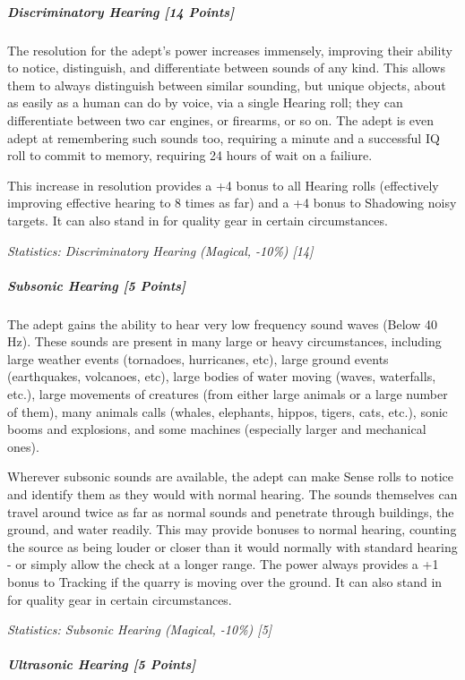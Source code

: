 \begin{multicols*}{3}
	\subparagraph{Discriminatory Hearing [14 Points]}
	
		The resolution for the adept's power increases immensely, improving their ability to notice, distinguish, and differentiate between sounds of any kind. This allows them to always distinguish between similar sounding, but unique objects, about as easily as a human can do by voice, via a single Hearing roll; they can differentiate between two car engines, or firearms, or so on. The adept is even adept at remembering such sounds too, requiring a minute and a successful IQ roll to commit to memory, requiring 24 hours of wait on a failiure.
		
		This increase in resolution provides a +4 bonus to all Hearing rolls (effectively improving effective hearing to 8 times as far) and a +4 bonus to Shadowing noisy targets. It can also stand in for quality gear in certain circumstances.
	
		\textcolor{OliveGreen}{\textit{Statistics: Discriminatory Hearing (Magical, -10\%) [14] }}
	
	\subparagraph{Subsonic Hearing [5 Points]}
	
		The adept gains the ability to hear very low frequency sound waves (Below 40 Hz). These sounds are present in many large or heavy circumstances, including large weather events (tornadoes, hurricanes, etc), large ground events (earthquakes, volcanoes, etc), large bodies of water moving (waves, waterfalls, etc.), large movements of creatures (from either large animals or a large number of them), many animals calls (whales, elephants, hippos, tigers, cats, etc.), sonic booms and explosions, and some machines (especially larger and mechanical ones). 
		
		Wherever subsonic sounds are available, the adept can make Sense rolls to notice and identify them as they would with normal hearing. The sounds themselves can travel around twice as far as normal sounds and penetrate through buildings, the ground, and water readily. This may provide bonuses to normal hearing, counting the source as being louder or closer than it would normally with standard hearing - or simply allow the check at a longer range. The power always provides a +1 bonus to Tracking if the quarry is moving over the ground. It can also stand in for quality gear in certain circumstances.
	
		\textcolor{OliveGreen}{\textit{Statistics: Subsonic Hearing (Magical, -10\%) [5] }}
	
	\subparagraph{Ultrasonic Hearing [5 Points]}
	

\end{multicols*}

